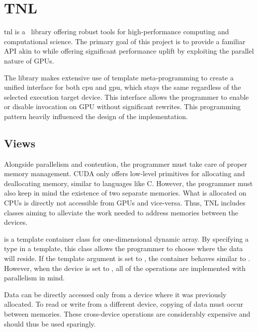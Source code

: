 \section{TNL}

\acrfull{tnl} \cite{tnl} is a \CC\ library offering robust tools for high-performance computing and computational science. The primary goal of this project is to provide a familiar API akin to  while offering significant performance uplift by exploiting the parallel nature of GPUs.

The library makes extensive use of template meta-programming to create a unified interface for both \acrshort{cpu} and \acrshort{gpu}, which stays the same regardless of the selected execution target device. This interface allows the programmer to enable or disable invocation on GPU without significant rewrites. This programming pattern heavily influenced the design of the implementation.

\subsection{Views}

Alongside parallelism and contention, the programmer must take care of proper memory management. CUDA only offers low-level primitives for allocating and deallocating memory, similar to languages like C. However, the programmer must also keep in mind the existence of two separate memories. What is allocated on CPUs is directly not accessible from GPUs and vice-versa. Thus, TNL includes classes aiming to alleviate the work needed to address memories between the devices.

 is a template container class for one-dimensional dynamic array. By specifying a type in a template, this class allows the programmer to choose where the data will reside. If the template argument is set to , the container behaves similar to . However, when the device is set to , all of the operations are implemented with parallelism in mind.

Data can be directly accessed only from a device where it was previously allocated. To read or write from a different device, copying of data must occur between memories. These cross-device operations are considerably expensive and should thus be used sparingly.

